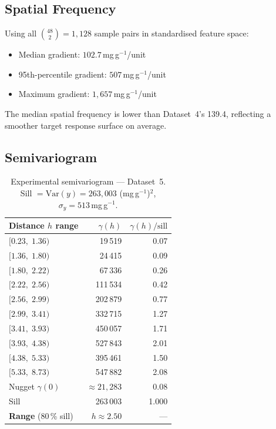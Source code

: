 \documentclass[12pt,a4paper]{article}
\begin{document}
\subsection{Spatial Frequency}

Using all $\binom{48}{2} = 1{,}128$ sample pairs in standardised feature
space:
\begin{itemize}[leftmargin=*]
  \item Median gradient: $102.7$\,mg\,g$^{-1}$/unit
  \item 95th-percentile gradient: $507$\,mg\,g$^{-1}$/unit
  \item Maximum gradient: $1{,}657$\,mg\,g$^{-1}$/unit
\end{itemize}

The median spatial frequency is lower than Dataset~4's 139.4, reflecting
a smoother target response surface on average.

\subsection{Semivariogram}

\begin{table}[h]
\centering
\caption{Experimental semivariogram — Dataset~5.
  Sill $= \text{Var}(y) = 263{,}003$ (mg\,g$^{-1}$)$^2$,
  $\sigma_y = 513$\,mg\,g$^{-1}$.}
\label{tab:ds5_variogram}
\small
\begin{tabular}{lrr}
\toprule
Distance $h$ range & $\gamma(h)$ & $\gamma(h)/\text{sill}$ \\
\midrule
$[0.23,\;1.36)$ &  19\,519 & 0.07 \\
$[1.36,\;1.80)$ &  24\,415 & 0.09 \\
$[1.80,\;2.22)$ &  67\,336 & 0.26 \\
$[2.22,\;2.56)$ & 111\,534 & 0.42 \\
$[2.56,\;2.99)$ & 202\,879 & 0.77 \\
$[2.99,\;3.41)$ & 332\,715 & 1.27 \\
$[3.41,\;3.93)$ & 450\,057 & 1.71 \\
$[3.93,\;4.38)$ & 527\,843 & 2.01 \\
$[4.38,\;5.33)$ & 395\,461 & 1.50 \\
$[5.33,\;8.73)$ & 547\,882 & 2.08 \\
\midrule
Nugget $\gamma(0)$    & $\approx 21{,}283$ & 0.08 \\
Sill                  & 263\,003 & 1.000 \\
\textbf{Range} (80\,\% sill) & $h \approx 2.50$ & — \\
\bottomrule
\end{tabular}
\end{table}
\end{document}
